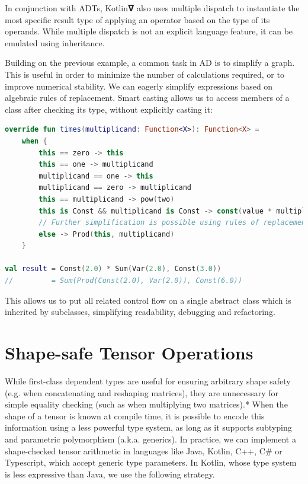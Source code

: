 \documentclass[12pt,initial,twoside,maitrise]{dms}
\numberwithin{equation}{section}
\numberwithin{table}{chapter}
\numberwithin{figure}{chapter}
\begin{document}
In conjunction with ADTs, Kotlin𝛁 also uses multiple dispatch to instantiate the most specific result type of applying an operator based on the type of its operands. While multiple dispatch is not an explicit language feature, it can be emulated using inheritance.

Building on the previous example, a common task in AD is to simplify a graph. This is useful in order to minimize the number of calculations required, or to improve numerical stability. We can eagerly simplify expressions based on algebraic rules of replacement. Smart casting allows us to access members of a class after checking its type, without explicitly casting it:

\begin{lstlisting}[caption={Simple code listing.}, language=Kotlin]
override fun times(multiplicand: Function<X>): Function<X> =
    when {
        this == zero -> this
        this == one -> multiplicand
        multiplicand == one -> this
        multiplicand == zero -> multiplicand
        this == multiplicand -> pow(two)
        this is Const && multiplicand is Const -> const(value * multiplicand.value)
        // Further simplification is possible using rules of replacement
        else -> Prod(this, multiplicand)
    }

val result = Const(2.0) * Sum(Var(2.0), Const(3.0))
//         = Sum(Prod(Const(2.0), Var(2.0)), Const(6.0))
\end{lstlisting}

This allows us to put all related control flow on a single abstract class which is inherited by subclasses, simplifying readability, debugging and refactoring.

\section{Shape-safe Tensor Operations}\label{sec:shape-safe-tensor-operations}

While first-class dependent types are useful for ensuring arbitrary shape safety (e.g. when concatenating and reshaping matrices), they are unnecessary for simple equality checking (such as when multiplying two matrices).* When the shape of a tensor is known at compile time, it is possible to encode this information using a less powerful type system, as long as it supports subtyping and parametric polymorphism (a.k.a. generics). In practice, we can implement a shape-checked tensor arithmetic in languages like Java, Kotlin, C++, C# or Typescript, which accept generic type parameters. In Kotlin, whose type system is less expressive than Java, we use the following strategy.
\end{document}
